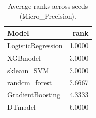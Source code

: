 \begin{table}[t]
\centering
\begin{tabular}{lr}
\toprule
Model & rank \\
\midrule
LogisticRegression & 1.0000 \\
XGBmodel & 3.0000 \\
sklearn_SVM & 3.0000 \\
random_forest & 3.6667 \\
GradientBoosting & 4.3333 \\
DTmodel & 6.0000 \\
\bottomrule
\end{tabular}
\caption{Average ranks across seeds (Micro_Precision).}
\label{tab:avg_rank_Micro_Precision}
\end{table}